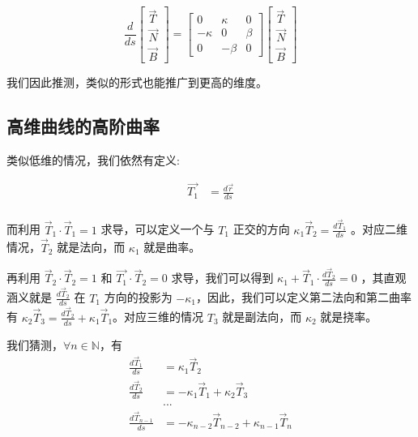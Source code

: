 \documentclass[fontset=windows]{article}
\begin{document}
$$
\frac{d}{ds}
\begin{bmatrix}
    \vec{T} \\
    \vec{N} \\
    \vec{B}
\end{bmatrix} = 
\begin{bmatrix}
    0 & \kappa & 0\\
    -\kappa & 0 & \beta \\
    0 & -\beta & 0
\end{bmatrix}
\begin{bmatrix}
    \vec{T}  \\
    \vec{N}  \\
    \vec{B} 
\end{bmatrix}
$$

我们因此推测，类似的形式也能推广到更高的维度。

\subsection{高维曲线的高阶曲率}

类似低维的情况，我们依然有定义:

$$
\begin{aligned}
    \vec{T_1} &= \frac{d\vec{r}}{ds} \\ 
\end{aligned}
$$

而利用 $\vec{T}_1\cdot\vec{T}_1 = 1$ 求导，可以定义一个与 $T_1$ 正交的方向 ${\kappa_1} \vec{T}_2 = \frac{d\vec{T}_1}{ds}$ 。对应二维情况，$\vec{T}_2$ 就是法向，而 $\kappa_1$ 就是曲率。

再利用 $\vec{T}_2\cdot\vec{T}_2 = 1$ 和 $\vec{T_1}\cdot\vec{T}_2 = 0$ 求导，我们可以得到 $\kappa_1 + \vec{T}_1 \cdot \frac{d\vec{T}_2}{ds} = 0 $ ，其直观涵义就是 $\frac{d\vec{T}_2}{ds}$ 在 $T_1$ 方向的投影为 $-\kappa_1$，因此，我们可以定义第二法向和第二曲率有 $\kappa_2 \vec{T}_3 = \frac{d\vec{T}_2}{ds} + \kappa_1 \vec{T}_1$。对应三维的情况 $T_3$ 就是副法向，而 $\kappa_2$ 就是挠率。

我们猜测，$\forall n \in \mathbb{N}$，有
$$
\begin{aligned}    
    \frac{d\vec{T}_1}{ds}   &= \kappa_1 \vec{T}_2 \\
    \frac{d\vec{T}_2}{ds}   &= -\kappa_1 \vec{T}_1  + \kappa_2 \vec{T}_3 \\
    &...\\
    \frac{d\vec{T}_{n-1}}{ds} &= -\kappa_{n-2} \vec{T}_{n-2}  + \kappa_{n-1} \vec{T}_{n} \\
\end{aligned}
$$
\end{document}
